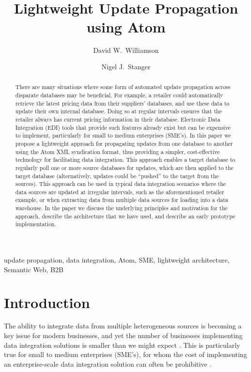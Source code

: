 \documentclass{CRPITStyle}
\title{Lightweight Update Propagation using Atom}
\author{David W.\ Williamson \and Nigel J.\ Stanger}
\affiliation{Department of Information Science, University of Otago, \\
	PO Box 56, Dunedin, New Zealand \\
	Email:~\texttt{\{dwilliamson,nstanger\}@infoscience.otago.ac.nz}}
\begin{document}
\maketitle

\begin{abstract}
There are many situations where some form of automated update
propagation across disparate databases may be beneficial. For example, a
retailer could automatically retrieve the latest pricing data from their
suppliers' databases, and use these data to update their own internal
database. Doing so at regular intervals ensures that the retailer always
has current pricing information in their database. Electronic Data
Integration (EDI) tools that provide such features already exist but can
be expensive to implement, particularly for small to medium enterprises
(SME's). In this paper we propose a lightweight approach for propagating
updates from one database to another using the Atom XML syndication
format, thus providing a simpler, cost-effective technology for
facilitating data integration. This approach enables a target database
to regularly poll one or more source databases for updates, which are
then applied to the target database (alternatively, updates could be
``pushed'' to the target from the sources). This approach can be used in
typical data integration scenarios where the data sources are updated at
irregular intervals, such as the aforementioned retailer example, or
when extracting data from multiple data sources for loading into a data
warehouse. In the paper we discuss the underlying principles and
motivation for the approach, describe the architecture that we have
used, and describe an early prototype implementation.
\end{abstract}
\vspace{.1in}

 update propagation, data integration, Atom,
SME, lightweight architecture, Semantic Web, B2B

\section{Introduction}

The ability to integrate data from multiple heterogeneous sources is
becoming a key issue for modern businesses, and yet the number of
businesses implementing data integration solutions is smaller than we
might expect \cite{Beck-R-2002-Bled,vaHe-E-1999-EDI}. This is
particularly true for small to medium enterprises (SME's), for whom the
cost of implementing an enterprise-scale data integration solution can
often be prohibitive
\cite{Beck-R-2002-Bled,Guo-J-2003-DocEng,Somm-RA-2002-SIGMOD}.
\end{document}
